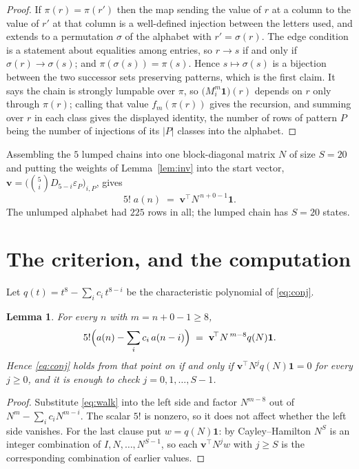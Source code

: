 \documentclass[11pt,a4paper]{article}
\theoremstyle{plain}
\newtheorem{lemma}[theorem]{Lemma}
\theoremstyle{definition}
\begin{document}
\begin{proof}
If $\pi(r)=\pi(r')$ then the map sending the value of $r$ at a column to the value of $r'$
at that column is a well-defined injection between the letters used, and extends to a
permutation $\sigma$ of the alphabet with $r'=\sigma(r)$. The edge condition is a statement
about equalities among entries, so $r\to s$ if and only if $\sigma(r)\to\sigma(s)$; and
$\pi(\sigma(s))=\pi(s)$. Hence $s\mapsto\sigma(s)$ is a bijection between the two successor
sets preserving patterns, which is the first claim. It says the chain is strongly lumpable
over $\pi$, so $\bigl(M_i^{m}\mathbf{1}\bigr)(r)$ depends on $r$ only through $\pi(r)$;
calling that value $f_m(\pi(r))$ gives the recursion, and summing over $r$ in each class
gives the displayed identity, the number of rows of pattern $P$ being the number of
injections of its $|P|$ classes into the alphabet.
\end{proof}

Assembling the $5$ lumped chains into one block-diagonal matrix $N$ of size $S=20$ and
putting the weights of Lemma~\ref{lem:inv} into the start vector,
$\mathbf{v}=\bigl(\binom{5}{i}D_{5-i}\varepsilon_P\bigr)_{i,P}$, gives
\begin{equation}\label{eq:walk}
5!\;a(n)\;=\;\mathbf{v}^{\!\top}N^{\,n+0-1}\mathbf{1} .
\end{equation}
The unlumped alphabet had $225$ rows in all; the lumped chain has $S=20$ states.

\section{The criterion, and the computation}

Let $q(t)=t^{8}-\sum_i c_i\,t^{8-i}$ be the characteristic polynomial of
\eqref{eq:conj}.

\begin{lemma}\label{lem:crit}
For every $n$ with $m=n+0-1\ge8$,
\[
5!\Bigl(a(n)-\sum_i c_i\,a(n-i)\Bigr)\;=\;\mathbf{v}^{\!\top}N^{\,m-8}q(N)\mathbf{1} .
\]
Hence \eqref{eq:conj} holds from that point on if and only if
$\mathbf{v}^{\!\top}N^{j}q(N)\mathbf{1}=0$ for every $j\ge0$, and it is enough to check
$j=0,1,\dots,S-1$.
\end{lemma}

\begin{proof}
Substitute \eqref{eq:walk} into the left side and factor $N^{m-8}$ out of
$N^{m}-\sum_i c_iN^{m-i}$. The scalar $5!$ is nonzero, so it does not affect whether
the left side vanishes. For the last clause put $w=q(N)\mathbf{1}$: by Cayley--Hamilton
$N^{S}$ is an integer combination of $I,N,\dots,N^{S-1}$, so each
$\mathbf{v}^{\!\top}N^{j}w$ with $j\ge S$ is the corresponding combination of earlier
values.
\end{proof}
\end{document}
